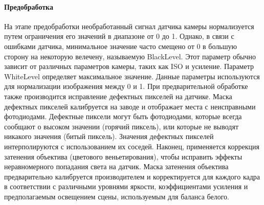 \paragraph{Предобработка}

На этапе предобработки необработанный сигнал датчика камеры нормализуется путем ограничения его значений в диапазоне от 0 до 1. Однако, в связи с ошибками датчика, минимальное значение часто смещено от 0 в большую сторону на некоторую велечену, называемую BlackLevel. Этот параметр обычно зависит от различных параметров камеры, таких как ISO и усиление. Параметр WhiteLevel определяет максимальное значение. Данные параметры используются для нормализации изображения между 0 и 1. При предварительной обработке также производится исправление дефектных пикселей на датчике. Маска дефектных пикселей калибруется на заводе и отображает места с неисправными фотодиодами. Дефектные пиксели могут быть фотодиодами, которые всегда сообщают о высоком значении (горячий пиксель), или которые не выводят никакого значения (битый пиксель). Значения дефектных пикселей интерполируются с использованием их соседей. Наконец, применяется коррекция затенения объектива (цветового веньетирования), чтобы исправить эффекты неравномерного попадания света на датчик. Маска затенения объектива предварительно калибруется производителем и корректируется для каждого кадра в соответствии с различными уровнями яркости, коэффициентами усиления и предполагаемым освещением сцены, используемым для баланса белого.